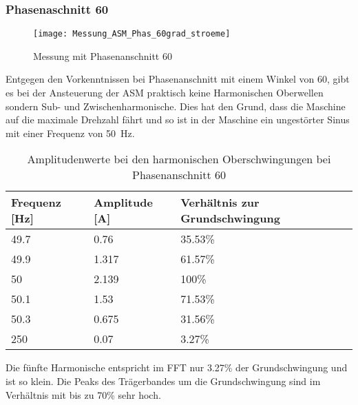 \subsubsection*{Phasenaschnitt 60\textdegree}
\begin{figure}[ht!]
	\centering
	\texttt{[image: Messung\_ASM\_Phas\_60grad\_stroeme]}	
	\caption{Messung mit Phasenanschnitt 60\textdegree}\label{fig:Mess_Phas_60grad_stroeme}
\end{figure}
Entgegen den Vorkenntnissen bei Phasenanschnitt mit einem Winkel von 60\textdegree, gibt es bei der Ansteuerung der ASM praktisch keine Harmonischen Oberwellen sondern Sub- und Zwischenharmonische. Dies hat den Grund, dass die Maschine auf die maximale Drehzahl fährt und so ist in der Maschine ein ungestörter Sinus mit einer Frequenz von \SI{50}{Hz}.

\begin{table}[ht!]
	\centering
	\begin{tabular}{|l|l|l|}
		\hline
		Frequenz {[}Hz{]} & Amplitude {[}A{]} & Verhältnis zur Grundschwingung	\\ \hline
		49.7              & 0.76              & 35.53\%							\\ \hline
		49.9              & 1.317             & 61.57\%							\\ \hline
		50                & 2.139             & 100\%							\\ \hline
		50.1              & 1.53              & 71.53\%							\\ \hline
		50.3              & 0.675             & 31.56\%							\\ \hline
		250               & 0.07              & 3.27\%							\\ \hline
	\end{tabular}
	\caption{Amplitudenwerte bei den harmonischen Oberschwingungen bei Phasenanschnitt 60\textdegree}\label{tab:Phas_60_ASM_stroeme}
\end{table}

Die fünfte Harmonische entspricht im FFT nur 3.27\% der Grundschwingung und ist so klein. Die Peaks des Trägerbandes um die Grundschwingung sind im Verhältnis mit bis zu 70\% sehr hoch.

\newpage

